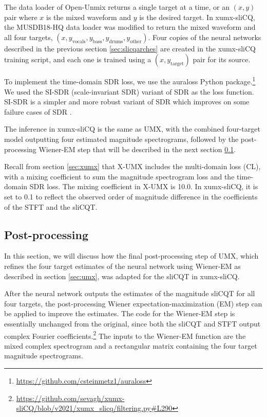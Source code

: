 \documentclass[report.tex]{subfiles}
\begin{document}
The data loader of Open-Unmix returns a single target at a time, or an $(x, y)$ pair where $x$ is the mixed waveform and $y$ is the desired target. In xumx-sliCQ, the MUSDB18-HQ data loader was modified to return the mixed waveform and all four targets, $(x, y_{\text{vocals}}, y_{\text{bass}}, y_{\text{drums}}, y_{\text{other}})$. Four copies of the neural networks described in the previous section \ref{sec:slicqarches} are created in the xumx-sliCQ training script, and each one is trained using a $(x, y_{\text{target}})$ pair for its source.

To implement the time-domain SDR loss, we use the auraloss Python package.\footnote{\url{https://github.com/csteinmetz1/auraloss}} We used the SI-SDR (scale-invariant SDR) \parencite{roux2018sdr} variant of SDR as the loss function. SI-SDR is a simpler and more robust variant of SDR which improves on some failure cases of SDR \parencite{roux2018sdr}.

The inference in xumx-sliCQ is the same as UMX, with the combined four-target model outputting four estimated magnitude spectrograms, followed by the post-processing Wiener-EM step that will be described in the next section \ref{sec:postprocessing}.

Recall from section \ref{sec:xumx} that X-UMX includes the multi-domain loss (CL), with a mixing coefficient to sum the magnitude spectrogram loss and the time-domain SDR loss. The mixing coefficient in X-UMX is 10.0. In xumx-sliCQ, it is set to 0.1 to reflect the observed order of magnitude difference in the coefficients of the STFT and the sliCQT.

\newpagefill

\subsection{Post-processing}
\label{sec:postprocessing}

In this section, we will discuss how the final post-processing step of UMX, which refines the four target estimates of the neural network using Wiener-EM as described in section \ref{sec:umx}, was adapted for the sliCQT in xumx-sliCQ.

After the neural network outputs the estimates of the magnitude sliCQT for all four targets, the post-processing Wiener expectation-maximization (EM) step can be applied to improve the estimates. The code for the Wiener-EM step is essentially unchanged from the original, since both the sliCQT and STFT output complex Fourier coefficients.\footnote{\url{https://github.com/sevagh/xumx-sliCQ/blob/v2021/xumx_slicq/filtering.py\#L290}} The inputs to the Wiener-EM function are the mixed complex spectrogram and a rectangular matrix containing the four target magnitude spectrograms.
\end{document}
